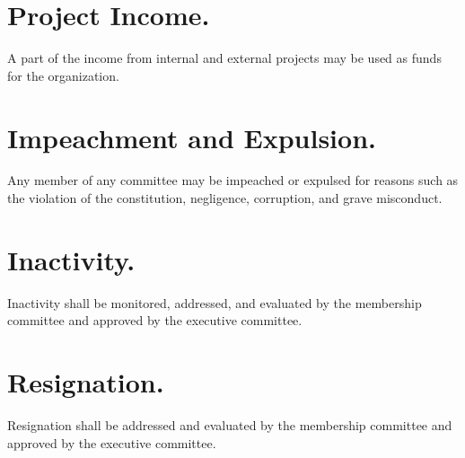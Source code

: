 \documentclass[12pt]{constitution}
\begin{document}
\section{Project Income.}
A part of the income from internal and external projects may be used as funds for the organization.

\section{Impeachment and Expulsion.}
Any member of any committee may be impeached or expulsed for reasons such as
the violation of the constitution, negligence, corruption, and grave misconduct.

\section{Inactivity.}
Inactivity shall be monitored, addressed, and evaluated by the
membership committee and approved by the executive committee.

\section{Resignation.}
Resignation shall be addressed and evaluated by the membership committee and
approved by the executive committee.
\end{document}
